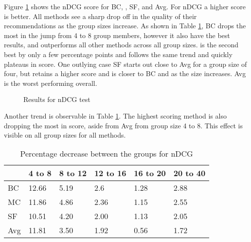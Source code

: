 Figure \ref{fig:ndcg} shows the nDCG score for BC, \MC, SF, and Avg. For nDCG a higher score is better.
All methods see a sharp drop off in the quality of their recommendations as the group sizes increase.
As shown in Table \ref{tbl:ndcg}, BC drops the most in the jump from 4 to 8 group members, however it also have the best results, and outperforms all other methods across all group sizes.
\MC is the second best by only a few percentage points and follows the same trend and quickly plateaus in score.
One outlying case SF starts out close to Avg for a group size of four, but retains a higher score and is closer to BC and \MC as the size increases.
Avg is the worst performing overall.

\begin{figure}[H]
	\caption{Results for nDCG test}\label{fig:ndcg}
\end{figure}

Another trend is observable in Table \ref{tbl:ndcg}. The highest scoring method is also dropping the most in score, aside from Avg from group size 4 to 8. This effect is visible on all group sizes for all methods.

\begin{table}[H]
	\centering
	\begin{tabular}{|l|lllll|}\hline
		& 4 to 8 & 8 to 12 & 12 to 16 & 16 to 20 & 20 to 40 \\\hline
		BC 	& 12.66	& 5.19	& 2.6	& 1.28	& 2.88 \\
		MC  & 11.86	& 4.86	& 2.36	& 1.15	& 2.55 \\
		SF  & 10.51	& 4.20	& 2.00	& 1.13	& 2.05 \\
		Avg	& 11.81	& 3.50 	& 1.92	& 0.56	& 1.72 \\ \hline
	\end{tabular}
	\caption{Percentage decrease between the groups for nDCG}
	\label{tbl:ndcg}
\end{table}

